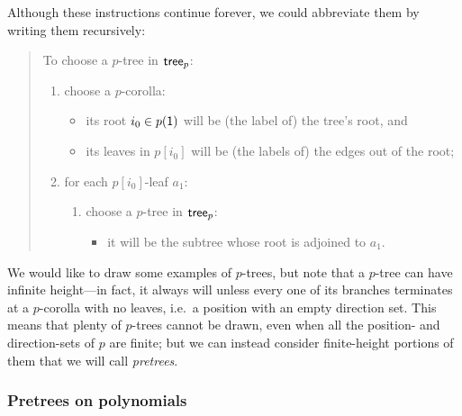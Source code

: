 \documentclass[Book-Poly]{subfiles}
\begin{document}
Although these instructions continue forever, we could abbreviate them by writing them recursively:
\begin{quote}
To choose a $p$-tree in $\mathsf{tree}_p$: 
\begin{enumerate}
    \item choose a $p$-corolla:
    \begin{itemize}
        \item its root $i_0\in p(\textsf{1})$ will be (the label of) the tree's root, and
        \item its leaves in $p[i_0]$ will be (the labels of) the edges out of the root;
    \end{itemize}
    \item for each $p[i_0]$-leaf $a_1$:
    \begin{enumerate}[label*=\arabic*.]
        \item choose a $p$-tree in $\mathsf{tree}_p$:
        \begin{itemize}
            \item it will be the subtree whose root is adjoined to $a_1$. 
        \end{itemize}
    \end{enumerate}
\end{enumerate}
\end{quote}

We would like to draw some examples of $p$-trees, but note that a $p$-tree can have infinite height---in fact, it always will unless every one of its branches terminates at a $p$-corolla with no leaves, i.e.\ a position with an empty direction set.
This means that plenty of $p$-trees cannot be drawn, even when all the position- and direction-sets of $p$ are finite; but we can instead consider finite-height portions of them that we will call \emph{pretrees}.

\subsubsection{Pretrees on polynomials}
\end{document}

